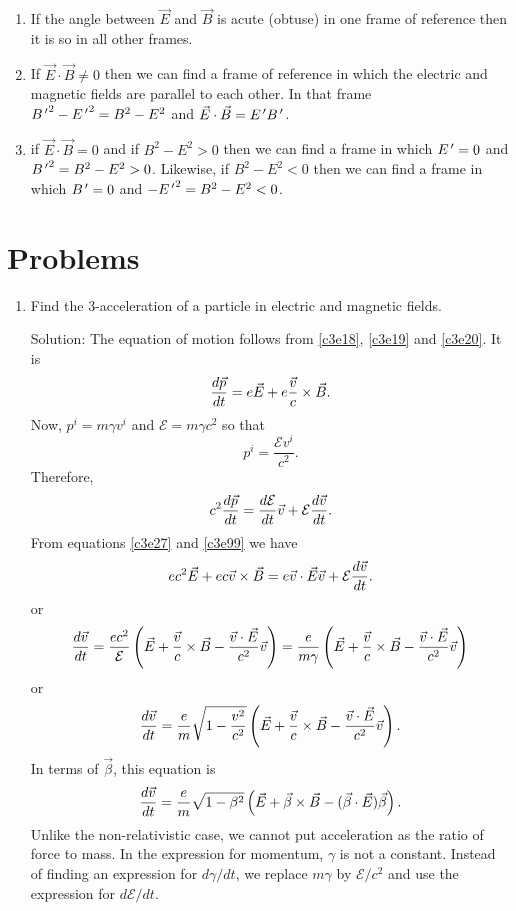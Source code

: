 \begin{enumerate}
\begin{enumerate}
\item If the angle between $\vec{E}$ and $\vec{B}$ is acute (obtuse) in one frame
of reference then it is so in all other frames.

\item If $\vec{E}\cdot\vec{B} \ne 0$ then we can find a frame of reference
in which the electric and magnetic fields are parallel to each other. In that
frame ${B^{\,\prime}}^2 - {E^{\,\prime}}^2 = B^2 - E^2$ and $\vec{E}\cdot\vec{B} = E^{\,\prime} B^{\,\prime}$.

\item if $\vec{E}\cdot\vec{B} = 0$ and if $B^2 - E^2 > 0$ then we can find
a frame in which $E^{\,\prime} = 0$ and ${B^{\,\prime}}^2 = B^2 - E^2 > 0$. Likewise, if $B^2
- E^2 < 0$ then we can find a frame in which $B^{\,\prime} = 0$ and $-{E^{\,\prime}}^2 = B^2 - 
E^2 < 0$. 
\end{enumerate}
\end{enumerate}

\section{Problems}
\begin{enumerate}
\item Find the 3-acceleration of a particle in electric and magnetic fields.
\item[Solution:] The equation of motion follows from \eqref{c3e18}, \eqref{c3e19}
and \eqref{c3e20}. It is
\begin{equation}\label{c3e99}
\frac{d{\vec{p}}}{d{t}} = e\vec{E} + e\frac{\vec{v}}{c}\times\vec{B}.
\end{equation}
Now, $p^i = m\gamma v^i$ and $\mathcal{E} = m\gamma c^2$ so that 
\[
p^i = \frac{\mathcal{E} v^i}{c^2}.
\]
Therefore,
\[
c^2\frac{d{\vec{p}}}{d{t}} = \frac{d{\mathcal{E}}}{d{t}}\vec{v} + \mathcal{E}\frac{d{\vec{v}}}{d{t}}.
\]
From equations \eqref{c3e27} and \eqref{c3e99} we have
\[
ec^2\vec{E} + ec\vec{v}\times\vec{B} = e\vec{v}\cdot\vec{E}\vec{v} + \mathcal{E}\frac{d{\vec{v}}}{d{t}}.
\]
or
\[
\frac{d{\vec{v}}}{d{t}} = \frac{ec^2}{\mathcal{E}}
\left(\vec{E} + \frac{\vec{v}}{c}\times\vec{B} - \frac{\vec{v}\cdot\vec{E}}{c^2}\vec{v}\right)
= \frac{e}{m\gamma}
\left(\vec{E} + \frac{\vec{v}}{c}\times\vec{B} - \frac{\vec{v}\cdot\vec{E}}{c^2}\vec{v}\right)
\]
or
\begin{equation}\label{c3e100}
\frac{d{\vec{v}}}{d{t}} = \frac{e}{m}\sqrt{1 - \frac{v^2}{c^2}}
\left(\vec{E} + \frac{\vec{v}}{c}\times\vec{B} - \frac{\vec{v}\cdot\vec{E}}{c^2}\vec{v}\right).
\end{equation}
In terms of $\vec{\beta}$, this equation is
\begin{equation}\label{c3e101}
\frac{d{\vec{v}}}{d{t}} = \frac{e}{m}\sqrt{1 - \beta^2}
\left(\vec{E} + \vec{\beta}\times\vec{B} - (\vec{\beta}\cdot\vec{E})\vec{\beta}\right).
\end{equation}
Unlike the non-relativistic case, we cannot put acceleration as the ratio of 
force to mass. In the expression for momentum, $\gamma$ is not a constant. Instead of
finding an expression for $d\gamma/dt$, we replace $m\gamma$ by $\mathcal{E}/c^2$
and use the expression for $d\mathcal{E}/dt$.
\end{enumerate}


